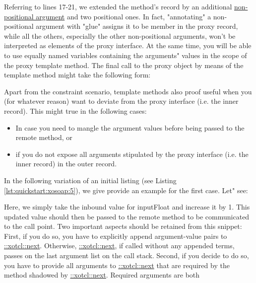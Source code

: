 Referring to lines 17-21, we extended the method's record by an additional \href{http://media.wu-wien.ac.at/doc/tutorial.html#non-pos-args}{non-positional argument} and 
two positional ones. In fact, "annotating" a non-positional argument with "glue" assigns it to be member in 
the proxy record, while all the others, especially the other non-positional arguments, won't be 
interpreted as elements of the proxy interface. At the same time, you will be able to use equally named 
variables containing the arguments" values in the scope of the proxy template method. The final call to 
the proxy object by means of the template method might take the following form:
%

%
Apart from the constraint scenario, template methods also proof useful when you (for whatever reason) 
want to deviate from the proxy interface (i.e. the inner record). This might true in the following cases:
\begin{itemize}
\item In case you need to mangle the argument values before being passed to the remote method, or
\item if you do not expose all arguments stipulated by the proxy interface (i.e. the inner record) in the 
outer record.
\end{itemize}
%
In the following variation of an initial listing (see Listing \ref{lst:quickstart:xosoap:5}), we give provide an 
example for the first case. Let" see:
%

%
Here, we simply take the inbound value for inputFloat and increase it by 1. This updated value should 
then be passed to the remote method to be communicated to the call point. Two important aspects 
should be retained from this snippet: First, if you do so, you have to explicitly append argument-value 
pairs to \href{http://media.wu-wien.ac.at/doc/tutorial.html#class_method_chaining}{::xotcl::next}. Otherwise, \href{http://media.wu-wien.ac.at/doc/tutorial.html#class_method_chaining}{::xotcl::next}, if called without any appended terms, passes on the last 
argument list on the call stack. Second, if you decide to do so, you have to provide all arguments 
to \href{http://media.wu-wien.ac.at/doc/tutorial.html#class_method_chaining}{::xotcl::next} that are required by the method shadowed by \href{http://media.wu-wien.ac.at/doc/tutorial.html#class_method_chaining}{::xotcl::next}. Required arguments are both 
